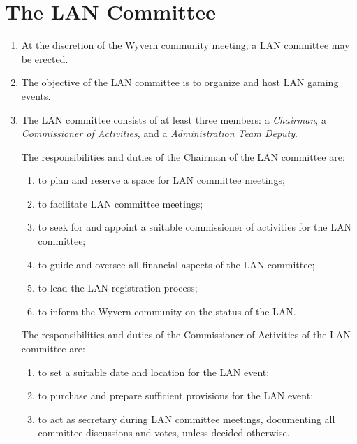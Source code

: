 \section{The LAN Committee}

\begin{enumerate}
	\item At the discretion of the Wyvern community meeting, a LAN committee may be erected.
	
    \item The objective of the LAN committee is to organize and host LAN gaming events.
    
	\item The LAN committee consists of at least three members: a \textit{Chairman}, a \textit{Commissioner of Activities}, and a \textit{Administration Team Deputy}.

    \begin{item}
        The responsibilities and duties of the Chairman of the LAN committee are:
        \begin{enumerate}
            \item to plan and reserve a space for LAN committee meetings;
            \item to facilitate LAN committee meetings;
            \item to seek for and appoint a suitable commissioner of activities for the LAN committee;
            \item to guide and oversee all financial aspects of the LAN committee;
            \item to lead the LAN registration process;
            \item to inform the Wyvern community on the status of the LAN.
        \end{enumerate}
    \end{item}
    
    \begin{item}
        The responsibilities and duties of the Commissioner of Activities of the LAN committee are:
        \begin{enumerate}
            \item to set a suitable date and location for the LAN event;
            \item to purchase and prepare sufficient provisions for the LAN event;
            \item to act as secretary during LAN committee meetings, documenting all committee discussions and votes, unless decided otherwise.
        \end{enumerate}
    \end{item}


\end{enumerate}
